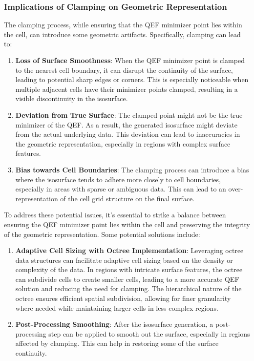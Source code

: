 \subsubsection{Implications of Clamping on Geometric Representation}

The clamping process, while ensuring that the QEF minimizer point lies within the cell, can introduce some geometric artifacts. Specifically, clamping can lead to:

\begin{enumerate}
    \item \textbf{Loss of Surface Smoothness}: When the QEF minimizer point is clamped to the nearest cell boundary, it can disrupt the continuity of the surface, leading to potential sharp edges or corners. This is especially noticeable when multiple adjacent cells have their minimizer points clamped, resulting in a visible discontinuity in the isosurface.
    
    \item \textbf{Deviation from True Surface}: The clamped point might not be the true minimizer of the QEF. As a result, the generated isosurface might deviate from the actual underlying data. This deviation can lead to inaccuracies in the geometric representation, especially in regions with complex surface features.
    
    \item \textbf{Bias towards Cell Boundaries}: The clamping process can introduce a bias where the isosurface tends to adhere more closely to cell boundaries, especially in areas with sparse or ambiguous data. This can lead to an over-representation of the cell grid structure on the final surface.
\end{enumerate}

To address these potential issues, it's essential to strike a balance between ensuring the QEF minimizer point lies within the cell and preserving the integrity of the geometric representation. Some potential solutions include:

\begin{enumerate}
    \item \textbf{Adaptive Cell Sizing with Octree Implementation}: Leveraging octree data structures can facilitate adaptive cell sizing based on the density or complexity of the data. In regions with intricate surface features, the octree can subdivide cells to create smaller cells, leading to a more accurate QEF solution and reducing the need for clamping. The hierarchical nature of the octree ensures efficient spatial subdivision, allowing for finer granularity where needed while maintaining larger cells in less complex regions.
    
    \item \textbf{Post-Processing Smoothing}: After the isosurface generation, a post-processing step can be applied to smooth out the surface, especially in regions affected by clamping. This can help in restoring some of the surface continuity.
\end{enumerate}

